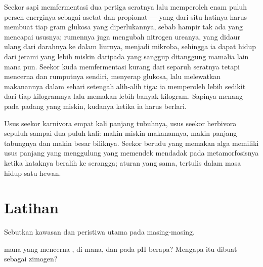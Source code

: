 \begin{example}\label{ex:b1:digestion-absorption:cowhorse}
Seekor sapi memfermentasi dua pertiga seratnya lalu memperoleh enam
puluh persen energinya sebagai asetat dan propionat --- yang dari situ
hatinya harus membuat tiap gram glukosa yang diperlukannya, sebab
hampir tak ada yang mencapai ususnya; rumennya juga mengubah nitrogen
ureanya, yang didaur ulang dari darahnya ke dalam liurnya, menjadi
 mikroba, sehingga ia dapat hidup dari jerami yang lebih miskin
 daripada yang sanggup ditanggung mamalia lain mana pun. Seekor
kuda memfermentasi kurang dari separuh seratnya tetapi mencerna 
dan  rumputnya sendiri, menyerap glukosa, lalu melewatkan
makanannya dalam sehari setengah alih-alih tiga: ia memperoleh lebih
sedikit dari tiap kilogramnya lalu memakan lebih banyak kilogram.
Sapinya menang pada padang yang miskin, kudanya ketika ia harus
berlari.
\end{example}

\begin{remark}\label{rem:b1:digestion-absorption:length}
Usus seekor karnivora empat kali panjang tubuhnya, usus seekor
herbivora sepuluh sampai dua puluh kali: makin miskin makanannya,
makin panjang tabungnya dan makin besar biliknya. Seekor berudu yang
memakan alga memiliki usus panjang yang menggulung yang memendek
mendadak pada metamorfosisnya ketika kataknya beralih ke serangga;
aturan yang sama, tertulis dalam masa hidup satu hewan.
\end{remark}

\section{Latihan}

\begin{exercise}[$\star$]\label{exo:b1:digestion-absorption:1}
Sebutkan kawasan  dan peristiwa utama pada masing-masing.
\end{exercise}

\begin{exercise}[$\star$]\label{exo:b1:digestion-absorption:2}
 mana yang mencerna , di mana, dan pada pH berapa? Mengapa
 itu dibuat sebagai zimogen?
\end{exercise}

